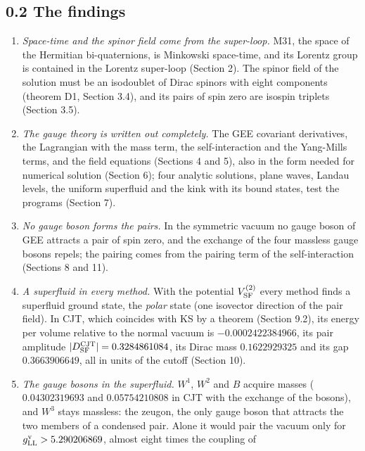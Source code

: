 \documentclass[
  10pt,
]{article}
\providecommand{\tightlist}{%
  \setlength{\itemsep}{0pt}\setlength{\parskip}{0pt}}
\begin{document}
\hypertarget{the-findings}{%
\subsection{0.2 The findings}\label{the-findings}}

\begin{enumerate}
\def\labelenumi{\arabic{enumi}.}
\tightlist
\item
  \emph{Space-time and the spinor field come from the super-loop.} M31,
  the space of the Hermitian bi-quaternions, is Minkowski space-time,
  and its Lorentz group is contained in the Lorentz super-loop (Section
  2). The spinor field of the solution must be an isodoublet of Dirac
  spinors with eight components (theorem D1, Section 3.4), and its pairs
  of spin zero are isospin triplets (Section 3.5).
\item
  \emph{The gauge theory is written out completely.} The GEE covariant
  derivatives, the Lagrangian with the mass term, the self-interaction
  and the Yang-Mills terms, and the field equations (Sections 4 and 5),
  also in the form needed for numerical solution (Section 6); four
  analytic solutions, plane waves, Landau levels, the uniform superfluid
  and the kink with its bound states, test the programs (Section 7).
\item
  \emph{No gauge boson forms the pairs.} In the symmetric vacuum no
  gauge boson of GEE attracts a pair of spin zero, and the exchange of
  the four massless gauge bosons repels; the pairing comes from the
  pairing term of the self-interaction (Sections 8 and 11).
\item
  \emph{A superfluid in every method.} With the potential
  \(V^{(2)}_{\rm SF}\) every method finds a superfluid ground state, the
  \emph{polar} state (one isovector direction of the pair field). In
  CJT, which coincides with KS by a theorem (Section 9.2), its energy
  per volume relative to the normal vacuum is \(-0.0002422384966\), its
  pair amplitude \(\lvert D^{\rm CJT}_{\rm SF}\rvert=0.3284861084\), its
  Dirac mass \(0.1622929325\) and its gap \(0.3663906649\), all in units
  of the cutoff (Section 10).
\item
  \emph{The gauge bosons in the superfluid.} \(W^1\), \(W^2\) and \(B\)
  acquire masses (\(0.04302319693\) and \(0.05754210808\) in CJT with
  the exchange of the bosons), and \(W^3\) stays massless: the zeugon,
  the only gauge boson that attracts the two members of a condensed
  pair. Alone it would pair the vacuum only for
  \(g^{\rm v}_{\rm LL}>5.290206869\), almost eight times the coupling of

\end{enumerate}
\end{document}
